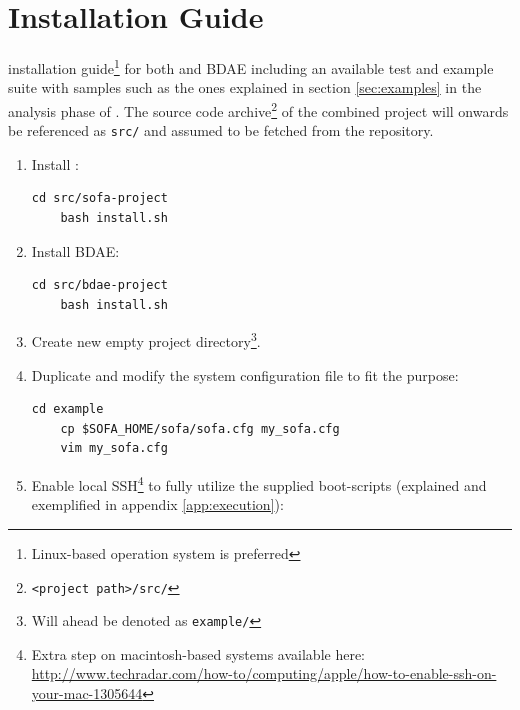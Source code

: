 \chapter{Installation Guide} \label{app:installation}
 installation guide\footnote{Linux-based operation system is preferred} for both \CodeName and BDAE including an available test and example suite with samples such as the ones explained in section \ref{sec:examples} in the analysis phase of \CodeName. The source code archive\footnote{\texttt{<project path>/src/}} of the combined project will onwards be referenced as \texttt{src/} and assumed to be fetched from the repository.

\begin{enumerate}
	\item Install \CodeName:
	
	\begin{lstlisting}[numbers=none, backgroundcolor=\color{sourcebackground}, rulecolor=\color{sourcebackground}, framextopmargin=5pt, framexbottommargin=5pt, frame=tb, xrightmargin=15pt]
	cd src/sofa-project
	bash install.sh
	\end{lstlisting}
	\vspace*{-6mm}
	\item Install BDAE:
	
	\begin{lstlisting}[numbers=none, backgroundcolor=\color{sourcebackground}, rulecolor=\color{sourcebackground}, framextopmargin=5pt, framexbottommargin=5pt, frame=tb, xrightmargin=15pt]
	cd src/bdae-project
	bash install.sh
	\end{lstlisting}
	\vspace*{-6mm}
	\item Create new empty project directory\footnote{Will ahead be denoted as \texttt{example/}}.
	\item Duplicate and modify the system configuration file to fit the purpose:
	
	\begin{lstlisting}[numbers=none, backgroundcolor=\color{sourcebackground}, rulecolor=\color{sourcebackground}, framextopmargin=5pt, framexbottommargin=5pt, frame=tb, xrightmargin=15pt]
	cd example
	cp $SOFA_HOME/sofa/sofa.cfg my_sofa.cfg
	vim my_sofa.cfg
	\end{lstlisting}
	
	\item Enable local SSH\footnote{Extra step on macintosh-based systems available here: \url{http://www.techradar.com/how-to/computing/apple/how-to-enable-ssh-on-your-mac-1305644}} to fully utilize the supplied boot-scripts (explained and exemplified in appendix \ref{app:execution}):
	

\end{enumerate}
